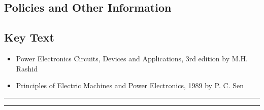 \subsection*{Policies and Other Information}
\subsection*{Key Text}
\begin{itemize}
    \item Power Electronics Circuits, Devices and Applications, 3rd edition by M.H. Rashid
    \item Principles of Electric Machines and Power Electronics, 1989 by P. C. Sen
\end{itemize}
\vspace{2ex}\hrule
\vspace{2ex}\hrule\vspace{2ex}